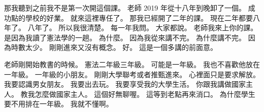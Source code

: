 \hypertarget{c01:cue:580}{}那我聽到之前我不是第一次開這個課。
\hypertarget{c01:cue:581}{}老師 2019 年從十八年到晚卸了一個。
\hypertarget{c01:cue:582}{}成功點的學校的好業。
\hypertarget{c01:cue:583}{}就來這裡專任了。
\hypertarget{c01:cue:584}{}那我已經開了二年的課。
\hypertarget{c01:cue:585}{}現在二年都要八年了。
\hypertarget{c01:cue:586}{}八年了。
\hypertarget{c01:cue:587}{}所以我很清楚。
\hypertarget{c01:cue:588}{}每一年我問。
\hypertarget{c01:cue:589}{}大家都說。
\hypertarget{c01:cue:590}{}老師我來上你的課。
\hypertarget{c01:cue:591}{}是因為我讀了憲法學的一趟。
\hypertarget{c01:cue:592}{}為什麼。
\hypertarget{c01:cue:593}{}因為我從來講不完。
\hypertarget{c01:cue:594}{}為什麼講不完。
\hypertarget{c01:cue:595}{}因為時數太少。
\hypertarget{c01:cue:596}{}剛剛進來又沒有概念。
\hypertarget{c01:cue:597}{}好。
\hypertarget{c01:cue:598}{}這是一個多講的前面意。

\hypertarget{c01:cue:599}{}老師剛開始教書的時候。
\hypertarget{c01:cue:600}{}憲法二年級三年級。
\hypertarget{c01:cue:601}{}可能是一年級。
\hypertarget{c01:cue:602}{}我也不喜歡他放在一年級。
\hypertarget{c01:cue:603}{}一年級的小朋友。
\hypertarget{c01:cue:604}{}剛剛大學聯考或者推甄進來。
\hypertarget{c01:cue:605}{}心裡面只是要求解放。
\hypertarget{c01:cue:606}{}我要認識男女朋友。
\hypertarget{c01:cue:607}{}我要出去玩。
\hypertarget{c01:cue:608}{}我要享受我的大學生活。
\hypertarget{c01:cue:609}{}你跟我講做國家主人。
\hypertarget{c01:cue:610}{}教我怎麼做國家主人。
\hypertarget{c01:cue:611}{}這個好無聊喔。
\hypertarget{c01:cue:612}{}這等到老點再來消口。
\hypertarget{c01:cue:613}{}為什麼學生要不用排在一年級。
\hypertarget{c01:cue:614}{}我就不懂啊。

